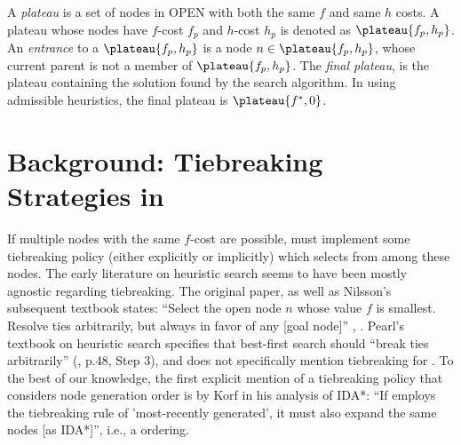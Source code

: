 A \emph{plateau} is a set of nodes in OPEN with both the same $f$ and same $h$ costs.
A plateau whose nodes have $f$-cost $f_p$ and $h$-cost $h_p$ is denoted as
$\plateau{f_p,h_p}$.
An  \emph{entrance} to a $\plateau{f_p,h_p}$ is a node $n \in \plateau{f_p,h_p}$, whose current parent is not a member of $\plateau{f_p,h_p}$.
The \emph{final plateau},  is the plateau containing the solution found by the search algorithm.
In \astar using admissible heuristics, the final plateau is  $\plateau{f^*,0}$.




\section{Background: Tiebreaking Strategies in \astar}

\label{sec:astar-background}



If multiple nodes with the same $f$-cost are possible, \astar
must implement some tiebreaking policy (either
explicitly or implicitly) which selects from among these nodes.
The early literature on heuristic search seems to have been mostly agnostic regarding tiebreaking.
The original \astar paper, as well as Nilsson's subsequent textbook 
states: ``Select the open node $n$ whose value $f$
is smallest. Resolve ties arbitrarily, but always in favor of any [goal
node]'' \cite[p.102 Step 2]{hart1968formal}, \cite[p.69]{Nilsson71}.
Pearl's textbook on heuristic search specifies that best-first search should ``break ties arbitrarily'' (\citeyear{pearl1984heuristics}, p.48, Step 3), and does not specifically mention tiebreaking for \astar.
To the best of our knowledge, the first explicit mention of a tiebreaking policy that considers node generation order is by Korf in his analysis of IDA*: ``If \astar employs the tiebreaking rule of 'most-recently generated', it must also expand the same nodes [as IDA*]'', i.e., a \lifo ordering.


